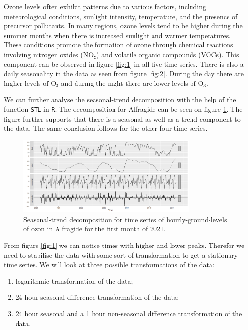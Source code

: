 \documentclass{article}
\begin{document}
Ozone levels often exhibit patterns due to various factors, including meteorological conditions, sunlight intensity, temperature, and the presence of precursor pollutants. In many regions, ozone levels tend to be higher during the summer months when there is increased sunlight and warmer temperatures. These conditions promote the formation of ozone through chemical reactions involving nitrogen oxides ($\text{NO}_\text{x}$) and volatile organic compounds (VOCs). This component can be observed in figure \ref{fig:1} in all five time series. There is also a daily seasonality in the data as seen from figure \ref{fig:2}. During the day there are higher levels of $\text{O}_3$ and during the night there are lower levels of $\text{O}_3$. 

We can further analyse the seasonal-trend decomposition  with the help of the function \verb|STL| in \verb|R|. The decomposition for Alfragide can be seen on figure \ref{fig:std}. The figure further supports that there is a seasonal as well as a trend component to the data. The same conclusion follows for the other four time series. 

\begin{figure}[ht!]
    \centering
    \includegraphics[width=0.80\textwidth]{Plots1/eda7.png}
    \caption{Seasonal-trend decomposition for time series of hourly-ground-levels of ozon in Alfragide for the first month of 2021.}
    \label{fig:std}
\end{figure}

From figure \ref{fig:1} we can notice times with higher and lower peaks. Therefor we need to stabilise the data with some sort of transformation to get a stationary time series. We will look at three possible transformations of the data:
\begin{enumerate}
    \item logarithmic transformation of the data;
    \item 24 hour seasonal difference transformation of the data;
    \item 24 hour seasonal and a 1 hour non-seasonal difference transformation of the data.
\end{enumerate}
\end{document}

